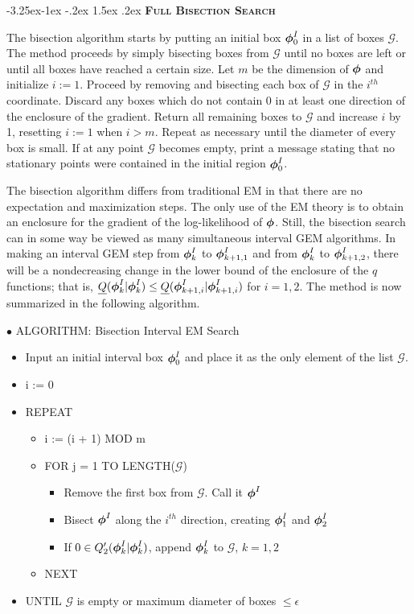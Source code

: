 \documentclass[10pt,twoside]{article}
\makeatletter
\renewcommand\subsection{\@startsection{subsection}{2}{\z@}%
                 {-3.25ex\@plus -1ex \@minus -.2ex}%
                 {1.5ex \@plus .2ex}%
                 {\scshape\centering\bfseries}} %
\makeatother
\begin{document}
\subsection{\textsc \bf Full Bisection Search}

The bisection algorithm starts by putting an initial box $\mbox{\boldmath $\phi$}_0^I$ in a
list of boxes $\mathcal{G}$.  The method proceeds by 
simply bisecting boxes from $\mathcal{G}$
until no boxes are left or until all boxes have reached a certain
size.  Let $m$ be the dimension of $\mbox{\boldmath $\phi$}$ and initialize $i := 1$.
Proceed by removing and bisecting each box of $\mathcal{G}$ in the $i^{th}$
coordinate.  Discard any boxes which do not contain $0$ in at least
one direction of the enclosure of the gradient.  Return all
remaining boxes to $\mathcal{G}$ and increase $i$ by 1, resetting $i := 1$
when
$i > m$.
Repeat as necessary until the diameter of every box is small.  If at
any point $\mathcal{G}$ becomes empty, print a message stating that
no stationary points were contained in the initial region $\mbox{\boldmath $\phi$}^I_0$.

The bisection algorithm differs from traditional EM in that there
are no expectation and maximization steps.  The only use of the EM
theory is to obtain an enclosure for the gradient of the
log-likelihood of $\mbox{\boldmath $\phi$}$.  Still, the bisection search can in some way be
viewed as many simultaneous interval GEM algorithms.  In making an interval
GEM
step from
$\mbox{\boldmath $\phi$}_k^I$ to $\mbox{\boldmath $\phi$}_{k+1,1}^I$ and from $\mbox{\boldmath $\phi$}_k^I$ 
to $\mbox{\boldmath $\phi$}_{k+1,2}^I$, there will be a 
nondecreasing change in the
lower bound of the enclosure of the $q$ functions; that is,
$\underline{Q}(\mbox{\boldmath $\phi$}_k^I|\mbox{\boldmath $\phi$}_k^I) 
\leq \underline{Q}(\mbox{\boldmath $\phi$}^I_{k+1,i}|\mbox{\boldmath $\phi$}^I_{k+1,i})$ 
for $i =1,2$. 
The method is now summarized in the following algorithm.

$\bullet$ ALGORITHM: Bisection Interval EM Search
\begin{itemize}
\item[] Input an initial interval box $\mbox{\boldmath $\phi$}^I_0$ and place it as the only
element of the list $\mathcal{G}$.
\item[] i := 0
\item[] REPEAT
  \begin{itemize}
  \item[]  i := (i + 1) MOD m
  \item[]  FOR j = 1 TO LENGTH($\mathcal{G}$)
    \begin{itemize}
    \item[] Remove the first box from $\mathcal{G}$.  Call it $\mbox{\boldmath $\phi$}^I$
    \item[] Bisect $\mbox{\boldmath $\phi$}^I$ along the $i^{th}$ direction, creating
$\mbox{\boldmath $\phi$}^I_1$ and $\mbox{\boldmath $\phi$}^I_2$
    \item[] If $0 \in Q'_2(\mbox{\boldmath $\phi$}^I_k|\mbox{\boldmath $\phi$}^I_k)$, append $\mbox{\boldmath $\phi$}^I_k$ to
$\mathcal{G}$, $k=1,2$
    \end{itemize}
  \item[] NEXT
  \end{itemize}
\item[] UNTIL  $\mathcal{G}$ is empty or maximum diameter of boxes $\leq
\epsilon$
\end{itemize}
\end{document}
